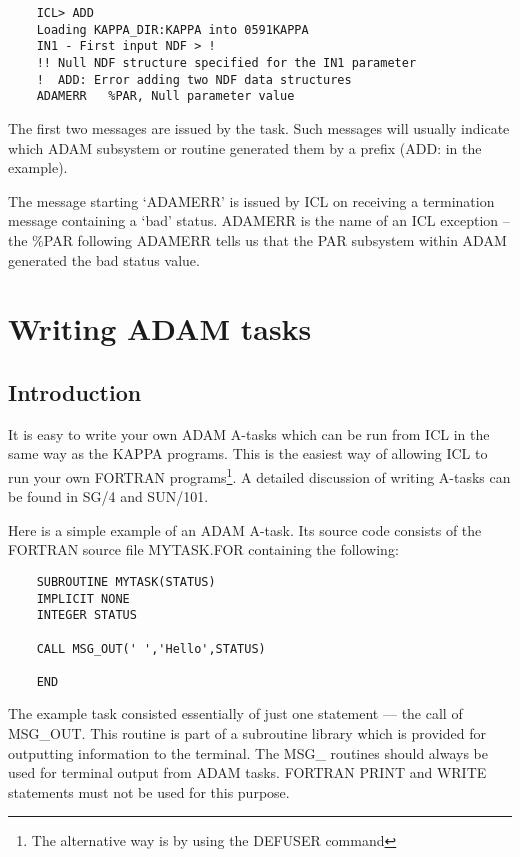 \documentclass[twoside,11pt]{report}
\newcommand{\xlabel}[1]{}
\begin{document}
\begin{verbatim}
    ICL> ADD
    Loading KAPPA_DIR:KAPPA into 0591KAPPA
    IN1 - First input NDF > !
    !! Null NDF structure specified for the IN1 parameter
    !  ADD: Error adding two NDF data structures
    ADAMERR   %PAR, Null parameter value
\end{verbatim}

The first two messages are issued by the task. Such messages will usually
indicate which ADAM subsystem or routine generated them by a prefix (ADD:
in the example).

The message starting `ADAMERR' is issued by ICL on receiving a termination
message containing a `bad' status.
ADAMERR is the name of an ICL exception -- the \%PAR following ADAMERR tells 
us that the PAR subsystem within ADAM generated the bad status value.


\chapter{\xlabel{writing_adam_tasks}Writing ADAM tasks}

\section{\xlabel{introduction}Introduction}

It is easy to write your own ADAM A-tasks which can be run from ICL in the
same way as the KAPPA programs. This is the easiest way of allowing ICL
to run your own FORTRAN programs\footnote{The alternative way is by using
the DEFUSER command}.
A detailed discussion of writing A-tasks can be found in SG/4 and SUN/101.

Here is a simple example of an ADAM A-task. Its source code consists of
the FORTRAN source file MYTASK.FOR containing the following:

\begin{verbatim}                   
    SUBROUTINE MYTASK(STATUS)
    IMPLICIT NONE
    INTEGER STATUS

    CALL MSG_OUT(' ','Hello',STATUS)

    END
\end{verbatim}
The example task consisted essentially of just one statement --- the call
of MSG\_OUT. This routine is part of a subroutine library which is provided
for outputting information to the terminal. The MSG\_ routines should always
be used for terminal output from ADAM tasks. FORTRAN PRINT and WRITE statements
must not be used for this purpose.
\end{document}
